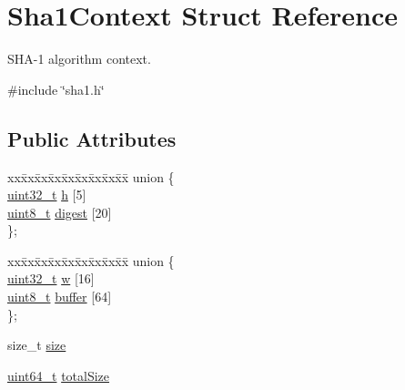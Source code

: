 \hypertarget{structSha1Context}{}\section{Sha1\+Context Struct Reference}
\label{structSha1Context}


S\+H\+A-\/1 algorithm context.  




{\ttfamily \#include \char`\"{}sha1.\+h\char`\"{}}

\subsection*{Public Attributes}
\begin{DoxyCompactItemize}
\item 
\begin{tabbing}
xx\=xx\=xx\=xx\=xx\=xx\=xx\=xx\=xx\=\kill
union \{\\
\>\hyperlink{stdint_8h_a435d1572bf3f880d55459d9805097f62}{uint32\_t} \hyperlink{structSha1Context_ad496e1d37d9ec42928f8fde91b713b9c}{h} \mbox{[}5\mbox{]}\\
\>\hyperlink{stdint_8h_aba7bc1797add20fe3efdf37ced1182c5}{uint8\_t} \hyperlink{structSha1Context_aa763a9ba0f9014894b8af6171eaf2a20}{digest} \mbox{[}20\mbox{]}\\
\}; \\

\end{tabbing}\item 
\begin{tabbing}
xx\=xx\=xx\=xx\=xx\=xx\=xx\=xx\=xx\=\kill
union \{\\
\>\hyperlink{stdint_8h_a435d1572bf3f880d55459d9805097f62}{uint32\_t} \hyperlink{structSha1Context_aba54cc9a68a11b1b2c45c6d7f29d221e}{w} \mbox{[}16\mbox{]}\\
\>\hyperlink{stdint_8h_aba7bc1797add20fe3efdf37ced1182c5}{uint8\_t} \hyperlink{structSha1Context_adb9a17a4ed76d2d5be86b8d33766e796}{buffer} \mbox{[}64\mbox{]}\\
\}; \\

\end{tabbing}\item 
size\+\_\+t \hyperlink{structSha1Context_a62278ac66e3da4e73e4e5350d228f95d}{size}
\item 
\hyperlink{stdint_8h_aec6fcb673ff035718c238c8c9d544c47}{uint64\+\_\+t} \hyperlink{structSha1Context_a6f61345a25396a4018b726d943ebf6b2}{total\+Size}
\end{DoxyCompactItemize}


